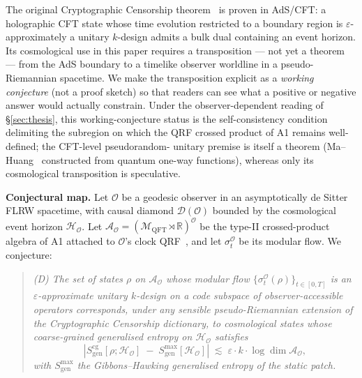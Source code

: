 \documentclass[epjc3,twocolumn]{svjour3}
\begin{document}
The original Cryptographic Censorship theorem~\cite{CryptoCensorship} is
proven in AdS/CFT: a holographic CFT state whose time evolution restricted
to a boundary region is $\varepsilon$-approximately a unitary $k$-design
admits a bulk dual containing an event horizon. Its cosmological use in
this paper requires a transposition --- not yet a theorem --- from the
AdS boundary to a timelike observer worldline in a pseudo-Riemannian
spacetime. We make the transposition explicit as a \emph{working
conjecture} (not a proof sketch) so that readers can see what a positive
or negative answer would actually constrain. Under the observer-dependent
reading of \S\ref{sec:thesis}, this working-conjecture status is the
self-consistency condition delimiting the subregion on which the QRF
crossed product of A1 remains well-defined; the CFT-level pseudorandom-
unitary premise is itself a theorem (Ma--Huang~\cite{MaHuang2025}
constructed from quantum one-way functions), whereas only its cosmological
transposition is speculative.

\medskip\noindent\textbf{Conjectural map.}\;
Let $\mathcal{O}$ be a geodesic observer in an asymptotically de Sitter
FLRW spacetime, with causal diamond $\mathcal{D}(\mathcal{O})$ bounded by
the cosmological event horizon $\mathcal{H}_\mathcal{O}$. Let
$\mathcal{A}_{\mathcal{O}} = \left( \mathcal{M}_{\mathrm{QFT}} \rtimes
\mathbb{R} \right)^{\mathcal{O}}$ be the type-II crossed-product algebra
of A1 attached to $\mathcal{O}$'s clock QRF~\cite{CLPW2023,DEHK2025a,DEHK2025b},
and let $\sigma_t^{\mathcal{O}}$ be its modular flow. We conjecture:

\begin{quote}
\emph{(D) The set of states $\rho$ on $\mathcal{A}_{\mathcal{O}}$ whose
modular flow $\{\sigma_t^{\mathcal{O}}(\rho)\}_{t \in [0,T]}$ is an
$\varepsilon$-approximate unitary $k$-design on a code subspace of
observer-accessible operators corresponds, under any sensible
pseudo-Riemannian extension of the Cryptographic Censorship dictionary,
to cosmological states whose coarse-grained generalised entropy on
$\mathcal{H}_\mathcal{O}$ satisfies}
\begin{equation}
\left| S_{\mathrm{gen}}^{\mathrm{cg}}[\rho; \mathcal{H}_\mathcal{O}]
  \;-\; S_{\mathrm{gen}}^{\max}[\mathcal{H}_\mathcal{O}] \right|
  \;\lesssim\; \varepsilon \cdot k \cdot \log\!\dim \mathcal{A}_{\mathcal{O}},
\label{eq:toy-dict}
\end{equation}
\emph{with $S_{\mathrm{gen}}^{\max}$ the Gibbons--Hawking generalised
entropy of the static patch.}
\end{quote}
\end{document}
